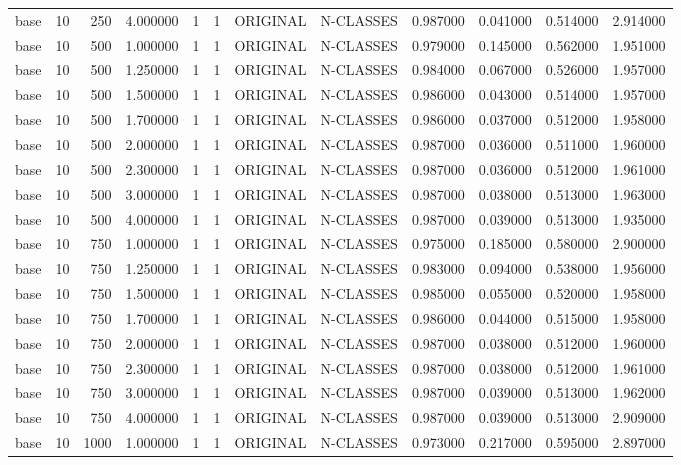 \begin{tabular}{lrrrllllrrrr}
base & 10 & 250 & 4.000000 & 1 & 1 & ORIGINAL & N-CLASSES & 0.987000 & 0.041000 & 0.514000 & 2.914000 \\
base & 10 & 500 & 1.000000 & 1 & 1 & ORIGINAL & N-CLASSES & 0.979000 & 0.145000 & 0.562000 & 1.951000 \\
base & 10 & 500 & 1.250000 & 1 & 1 & ORIGINAL & N-CLASSES & 0.984000 & 0.067000 & 0.526000 & 1.957000 \\
base & 10 & 500 & 1.500000 & 1 & 1 & ORIGINAL & N-CLASSES & 0.986000 & 0.043000 & 0.514000 & 1.957000 \\
base & 10 & 500 & 1.700000 & 1 & 1 & ORIGINAL & N-CLASSES & 0.986000 & 0.037000 & 0.512000 & 1.958000 \\
base & 10 & 500 & 2.000000 & 1 & 1 & ORIGINAL & N-CLASSES & 0.987000 & 0.036000 & 0.511000 & 1.960000 \\
base & 10 & 500 & 2.300000 & 1 & 1 & ORIGINAL & N-CLASSES & 0.987000 & 0.036000 & 0.512000 & 1.961000 \\
base & 10 & 500 & 3.000000 & 1 & 1 & ORIGINAL & N-CLASSES & 0.987000 & 0.038000 & 0.513000 & 1.963000 \\
base & 10 & 500 & 4.000000 & 1 & 1 & ORIGINAL & N-CLASSES & 0.987000 & 0.039000 & 0.513000 & 1.935000 \\
base & 10 & 750 & 1.000000 & 1 & 1 & ORIGINAL & N-CLASSES & 0.975000 & 0.185000 & 0.580000 & 2.900000 \\
base & 10 & 750 & 1.250000 & 1 & 1 & ORIGINAL & N-CLASSES & 0.983000 & 0.094000 & 0.538000 & 1.956000 \\
base & 10 & 750 & 1.500000 & 1 & 1 & ORIGINAL & N-CLASSES & 0.985000 & 0.055000 & 0.520000 & 1.958000 \\
base & 10 & 750 & 1.700000 & 1 & 1 & ORIGINAL & N-CLASSES & 0.986000 & 0.044000 & 0.515000 & 1.958000 \\
base & 10 & 750 & 2.000000 & 1 & 1 & ORIGINAL & N-CLASSES & 0.987000 & 0.038000 & 0.512000 & 1.960000 \\
base & 10 & 750 & 2.300000 & 1 & 1 & ORIGINAL & N-CLASSES & 0.987000 & 0.038000 & 0.512000 & 1.961000 \\
base & 10 & 750 & 3.000000 & 1 & 1 & ORIGINAL & N-CLASSES & 0.987000 & 0.039000 & 0.513000 & 1.962000 \\
base & 10 & 750 & 4.000000 & 1 & 1 & ORIGINAL & N-CLASSES & 0.987000 & 0.039000 & 0.513000 & 2.909000 \\
base & 10 & 1000 & 1.000000 & 1 & 1 & ORIGINAL & N-CLASSES & 0.973000 & 0.217000 & 0.595000 & 2.897000 \\

\end{tabular}

